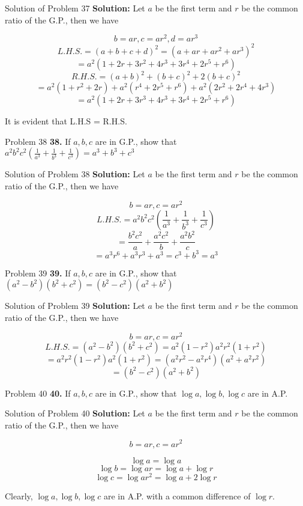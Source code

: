 \documentclass[aspectratio=1610,8pt]{beamer}
\begin{document}
\begin{frame}{Solution of Problem 37}
  \textbf{Solution:} Let $a$ be the first term and $r$ be the common ratio of
  the G.P., then we have

  $$b = ar, c = ar^2, d = ar^3$$
  $$L.H.S. = (a + b + c + d)^2 = (a + ar + ar^2 + ar^3)^2$$
  $$= a^2(1 + 2r + 3r^2 + 4r^3 + 3r^4 + 2r^5 + r^6)$$
  $$R.H.S. = (a + b)^2 + (b + c)^2 + 2(b + c)^2$$
  $$= a^2(1 + r^2 + 2r) + a^2(r^4 + 2r^5 + r^6) + a^2(2r^2 + 2r^4 + 4r^3)$$
  $$= a^2(1 + 2r + 3r^3 + 4r^3 + 3r^4 + 2r^5 + r^6)$$

  It is evident that L.H.S = R.H.S.
\end{frame}
\begin{frame}{Problem 38}
  \textbf{38.} If $a, b, c$ are in G.P., show that $a^2b^2c^2\left(\frac{1}{a^3}
  + \frac{1}{b^3} + \frac{1}{c^3}\right) = a^3 + b^3 + c^3$
\end{frame}
\begin{frame}{Solution of Problem 38}
  \textbf{Solution:} Let $a$ be the first term and $r$ be the common ratio of
  the G.P., then we have

  $$b = ar, c = ar^2$$
  $$L.H.S. = a^2b^2c^2\left(\frac{1}{a^3} + \frac{1}{b^3} + \frac{1}{c^3}\right)$$
  $$= \frac{b^2c^2}{a} + \frac{a^2c^2}{b} + \frac{a^2b^2}{c}$$
  $$= a^3r^6 + a^3r^3+ a^3 = c^3 + b^3 = a^3$$
\end{frame}
\begin{frame}{Problem 39}
  \textbf{39.} If $a, b, c$ are in G.P., show that $(a^2 - b^2)(b^2 + c^2) =
  (b^2 - c^2)(a^2 + b^2)$
\end{frame}
\begin{frame}{Solution of Problem 39}
  \textbf{Solution:} Let $a$ be the first term and $r$ be the common ratio of
  the G.P., then we have

  $$b = ar, c = ar^2$$
  $$L.H.S. = (a^2 - b^2)(b^2 + c^2) = a^2(1 - r^2)a^2r^2(1 + r^2)$$
  $$= a^2r^2(1 - r^2)a^2(1 + r^2) = (a^2r^2 - a^2r^4)(a^2 + a^2r^2)$$
  $$= (b^2 - c^2)(a^2 + b^2)$$
\end{frame}
\begin{frame}{Problem 40}
  \textbf{40.} If $a, b, c$ are in G.P., show that $\log a, \log b, \log c$ are
  in A.P.
\end{frame}
\begin{frame}{Solution of Problem 40}
  \textbf{Solution:} Let $a$ be the first term and $r$ be the common ratio of
  the G.P., then we have

  $$b = ar, c = ar^2$$

  $$\log a = \log a$$
  $$\log b = \log ar = \log a + \log r$$
  $$\log c = \log ar^2 = \log a + 2\log r$$

  Clearly, $\log a, \log b, \log c$ are in A.P. with a common difference of
  $\log r.$
\end{frame}
\end{document}
